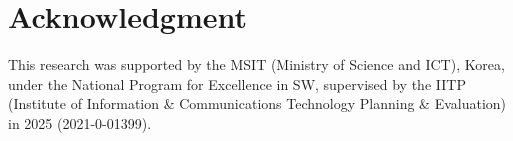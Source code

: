 \documentclass[conference]{IEEEtran}
\begin{document}
\section*{Acknowledgment}

This research was supported by the MSIT (Ministry of Science and ICT), Korea, under the National Program for Excellence in SW, supervised by the IITP (Institute of Information \& Communications Technology Planning \& Evaluation) in 2025 (2021-0-01399).




\end{document}

